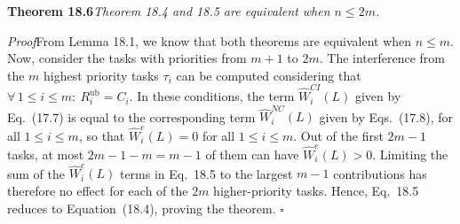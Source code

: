 \noindent
\textbf{Theorem 18.6}\quad \textit{Theorem 18.4 and 18.5 are equivalent when $n \leq 2m$.}

\medskip

\noindent
\textit{Proof}\quad From Lemma 18.1, we know that both theorems are equivalent when $n \leq m$.
Now, consider the tasks with priorities from $m+1$ to $2m$. The interference from the $m$
highest priority tasks $\tau_i$ can be computed considering that $\forall\, 1 \leq i \leq m:\ R_i^{\mathrm{ub}} = C_i$. In
these conditions, the term $\widehat{W}_i^{CI}(L)$ given by Eq.~(17.7) is equal to the corresponding
term $\widehat{W}_i^{NC}(L)$ given by Eqs.~(17.8), for all $1 \leq i \leq m$, so that $\widehat{W}_i^e(L) = 0$ for all
$1 \leq i \leq m$. Out of the first $2m-1$ tasks, at most $2m-1-m=m-1$ of them
can have $\widehat{W}_i^e(L) > 0$. Limiting the sum of the $\widehat{W}_i^e(L)$ terms in Eq.~18.5 to the largest
$m-1$ contributions has therefore no effect for each of the $2m$ higher-priority tasks.
Hence, Eq.~18.5 reduces to Equation~(18.4), proving the theorem. \hfill $\square$
